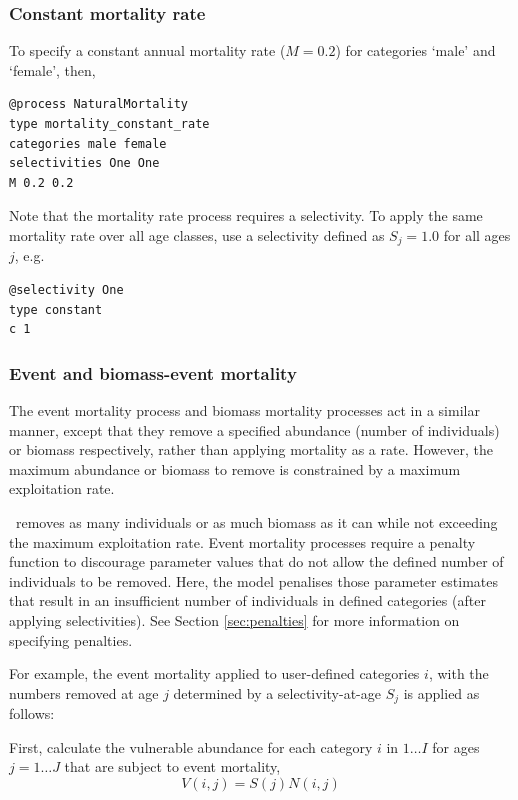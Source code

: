 \subsubsection*{Constant mortality rate}

To specify a constant annual mortality rate ($M=0.2$) for categories `male' and `female', then, 
{\small{\begin{verbatim}
@process NaturalMortality
type mortality_constant_rate
categories male female
selectivities One One
M 0.2 0.2
\end{verbatim}}}
Note that the mortality rate process requires a selectivity. To apply the same mortality rate over all age classes, use a selectivity defined as $S_j=1.0$ for all ages $j$, e.g.
{\small{\begin{verbatim}
@selectivity One
type constant
c 1
\end{verbatim}}}

\subsubsection*{Event and biomass-event mortality}

The event mortality process and biomass mortality processes act in a similar manner, except that they remove a specified abundance (number of individuals) or biomass respectively, rather than applying mortality as a rate. However, the maximum abundance or biomass to remove is constrained by a maximum exploitation rate.

 \CNAME\ removes as many individuals or as much biomass as it can while not exceeding the maximum exploitation rate. Event mortality processes require a penalty function to discourage parameter values that do not allow the defined number of individuals to be removed. Here, the model penalises those parameter estimates that result in an insufficient number of individuals in defined categories (after applying selectivities). See Section \ref{sec:penalties} for more information on specifying penalties.

For example, the event mortality applied to user-defined categories $i$, with the numbers removed at age $j$ determined by a selectivity-at-age $S_j$ is applied as follows:

First, calculate the vulnerable abundance for each category $i$ in $1 \ldots I$ for ages $j = 1 \ldots J$ that are subject to event mortality,
\begin{equation}
  V(i,j) = S(j) N(i,j)
\end{equation}

